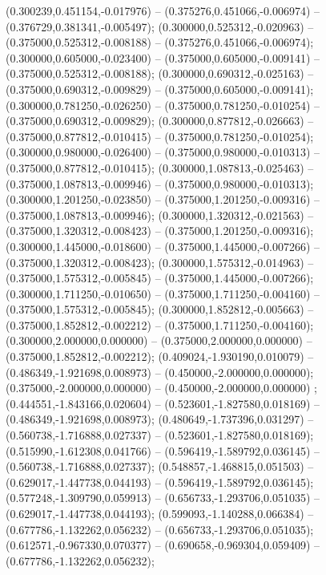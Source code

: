  (0.300239,0.451154,-0.017976) -- (0.375276,0.451066,-0.006974) -- (0.376729,0.381341,-0.005497);
 (0.300000,0.525312,-0.020963) -- (0.375000,0.525312,-0.008188) -- (0.375276,0.451066,-0.006974);
 (0.300000,0.605000,-0.023400) -- (0.375000,0.605000,-0.009141) -- (0.375000,0.525312,-0.008188);
 (0.300000,0.690312,-0.025163) -- (0.375000,0.690312,-0.009829) -- (0.375000,0.605000,-0.009141);
 (0.300000,0.781250,-0.026250) -- (0.375000,0.781250,-0.010254) -- (0.375000,0.690312,-0.009829);
 (0.300000,0.877812,-0.026663) -- (0.375000,0.877812,-0.010415) -- (0.375000,0.781250,-0.010254);
 (0.300000,0.980000,-0.026400) -- (0.375000,0.980000,-0.010313) -- (0.375000,0.877812,-0.010415);
 (0.300000,1.087813,-0.025463) -- (0.375000,1.087813,-0.009946) -- (0.375000,0.980000,-0.010313);
 (0.300000,1.201250,-0.023850) -- (0.375000,1.201250,-0.009316) -- (0.375000,1.087813,-0.009946);
 (0.300000,1.320312,-0.021563) -- (0.375000,1.320312,-0.008423) -- (0.375000,1.201250,-0.009316);
 (0.300000,1.445000,-0.018600) -- (0.375000,1.445000,-0.007266) -- (0.375000,1.320312,-0.008423);
 (0.300000,1.575312,-0.014963) -- (0.375000,1.575312,-0.005845) -- (0.375000,1.445000,-0.007266);
 (0.300000,1.711250,-0.010650) -- (0.375000,1.711250,-0.004160) -- (0.375000,1.575312,-0.005845);
 (0.300000,1.852812,-0.005663) -- (0.375000,1.852812,-0.002212) -- (0.375000,1.711250,-0.004160);
 (0.300000,2.000000,0.000000) -- (0.375000,2.000000,0.000000) -- (0.375000,1.852812,-0.002212);
 (0.409024,-1.930190,0.010079) -- (0.486349,-1.921698,0.008973) -- (0.450000,-2.000000,0.000000);
 (0.375000,-2.000000,0.000000) -- (0.450000,-2.000000,0.000000) ;
 (0.444551,-1.843166,0.020604) -- (0.523601,-1.827580,0.018169) -- (0.486349,-1.921698,0.008973);
 (0.480649,-1.737396,0.031297) -- (0.560738,-1.716888,0.027337) -- (0.523601,-1.827580,0.018169);
 (0.515990,-1.612308,0.041766) -- (0.596419,-1.589792,0.036145) -- (0.560738,-1.716888,0.027337);
 (0.548857,-1.468815,0.051503) -- (0.629017,-1.447738,0.044193) -- (0.596419,-1.589792,0.036145);
 (0.577248,-1.309790,0.059913) -- (0.656733,-1.293706,0.051035) -- (0.629017,-1.447738,0.044193);
 (0.599093,-1.140288,0.066384) -- (0.677786,-1.132262,0.056232) -- (0.656733,-1.293706,0.051035);
 (0.612571,-0.967330,0.070377) -- (0.690658,-0.969304,0.059409) -- (0.677786,-1.132262,0.056232);
